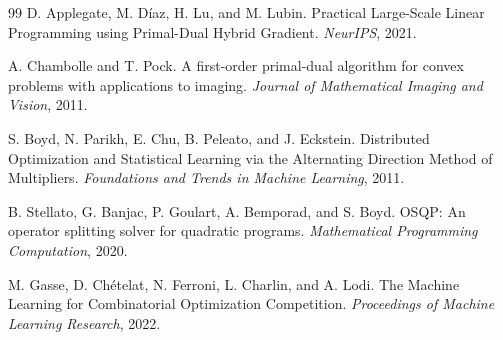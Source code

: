 \documentclass[UTF8,a4paper,12pt,fontset=fandol]{ctexart}
\begin{document}
\begin{thebibliography}{99}
D. Applegate, M. Díaz, H. Lu, and M. Lubin.
\newblock Practical Large-Scale Linear Programming using Primal-Dual Hybrid Gradient.
\newblock \emph{NeurIPS}, 2021.

A. Chambolle and T. Pock.
\newblock A first-order primal-dual algorithm for convex problems with applications to imaging.
\newblock \emph{Journal of Mathematical Imaging and Vision}, 2011.

S. Boyd, N. Parikh, E. Chu, B. Peleato, and J. Eckstein.
\newblock Distributed Optimization and Statistical Learning via the Alternating Direction Method of Multipliers.
\newblock \emph{Foundations and Trends in Machine Learning}, 2011.

B. Stellato, G. Banjac, P. Goulart, A. Bemporad, and S. Boyd.
\newblock OSQP: An operator splitting solver for quadratic programs.
\newblock \emph{Mathematical Programming Computation}, 2020.

M. Gasse, D. Chételat, N. Ferroni, L. Charlin, and A. Lodi.
\newblock The Machine Learning for Combinatorial Optimization Competition.
\newblock \emph{Proceedings of Machine Learning Research}, 2022.

\end{thebibliography}
\end{document}
